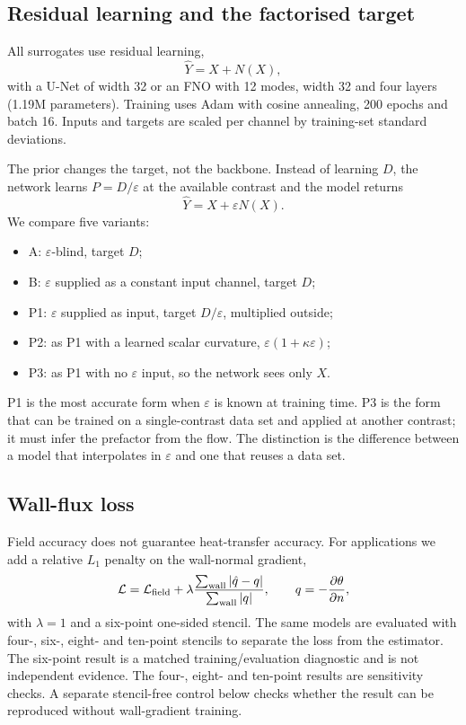 \documentclass[preprint,11pt,a4paper,times]{elsarticle}
\begin{document}
\subsection{Residual learning and the factorised target}
\label{sec:prior}

All surrogates use residual learning,
\begin{equation}
  \hat Y=X+N(X),
  \label{eq:residual}
\end{equation}
with a U-Net of width 32 or an FNO with 12 modes, width 32 and four layers (1.19M
parameters). Training uses Adam with cosine annealing, 200 epochs and batch 16. Inputs and
targets are scaled per channel by training-set standard deviations.

The prior changes the target, not the backbone. Instead of learning $D$, the network learns
$P=D/\varepsilon$ at the available contrast and the model returns
\begin{equation}
  \hat Y=X+\varepsilon N(X).
  \label{eq:prior}
\end{equation}
We compare five variants:
\begin{itemize}
\item A: $\varepsilon$-blind, target $D$;
\item B: $\varepsilon$ supplied as a constant input channel, target $D$;
\item P1: $\varepsilon$ supplied as input, target $D/\varepsilon$, multiplied outside;
\item P2: as P1 with a learned scalar curvature, $\varepsilon(1+\kappa\varepsilon)$;
\item P3: as P1 with no $\varepsilon$ input, so the network sees only $X$.
\end{itemize}
P1 is the most accurate form when $\varepsilon$ is known at training time. P3 is the form
that can be trained on a single-contrast data set and applied at another contrast; it must
infer the prefactor from the flow. The distinction is the difference between a model that
interpolates in $\varepsilon$ and one that reuses a data set.

\subsection{Wall-flux loss}

Field accuracy does not guarantee heat-transfer accuracy. For applications we add a relative
$L_1$ penalty on the wall-normal gradient,
\begin{equation}
  \mathcal L=\mathcal L_{\rm field}
  +\lambda\frac{\sum_{\rm wall}|\hat q-q|}{\sum_{\rm wall}|q|},
  \qquad q=-\frac{\partial\theta}{\partial n},
  \label{eq:fluxloss}
\end{equation}
with $\lambda=1$ and a six-point one-sided stencil. The same models are evaluated with four-,
six-, eight- and ten-point stencils to separate the loss from the estimator. The six-point
result is a matched training/evaluation diagnostic and is not independent evidence. The
four-, eight- and ten-point results are sensitivity checks. A separate stencil-free control
below checks whether the result can be reproduced without wall-gradient training.
\end{document}
